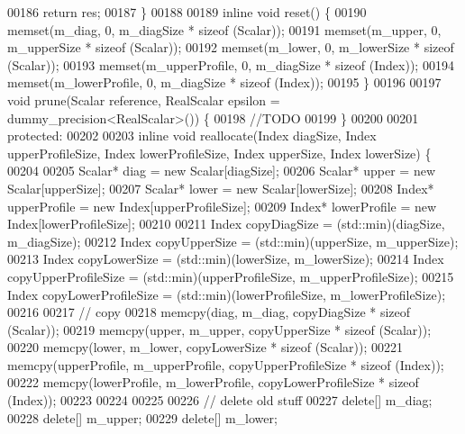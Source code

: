 \begin{DoxyCode}
00186         \textcolor{keywordflow}{return} res;
00187     \}
00188 
00189     \textcolor{keyword}{inline} \textcolor{keywordtype}{void} reset() \{
00190         memset(m\_diag, 0, m\_diagSize * \textcolor{keyword}{sizeof} (Scalar));
00191         memset(m\_upper, 0, m\_upperSize * \textcolor{keyword}{sizeof} (Scalar));
00192         memset(m\_lower, 0, m\_lowerSize * \textcolor{keyword}{sizeof} (Scalar));
00193         memset(m\_upperProfile, 0, m\_diagSize * \textcolor{keyword}{sizeof} (Index));
00194         memset(m\_lowerProfile, 0, m\_diagSize * \textcolor{keyword}{sizeof} (Index));
00195     \}
00196 
00197     \textcolor{keywordtype}{void} prune(Scalar reference, RealScalar epsilon = dummy\_precision<RealScalar>()) \{
00198         \textcolor{comment}{//TODO}
00199     \}
00200 
00201 \textcolor{keyword}{protected}:
00202 
00203     \textcolor{keyword}{inline} \textcolor{keywordtype}{void} reallocate(Index diagSize, Index upperProfileSize, Index lowerProfileSize, Index upperSize,
       Index lowerSize) \{
00204 
00205         Scalar* diag = \textcolor{keyword}{new} Scalar[diagSize];
00206         Scalar* upper = \textcolor{keyword}{new} Scalar[upperSize];
00207         Scalar* lower = \textcolor{keyword}{new} Scalar[lowerSize];
00208         Index* upperProfile = \textcolor{keyword}{new} Index[upperProfileSize];
00209         Index* lowerProfile = \textcolor{keyword}{new} Index[lowerProfileSize];
00210 
00211         Index copyDiagSize = (std::min)(diagSize, m\_diagSize);
00212         Index copyUpperSize = (std::min)(upperSize, m\_upperSize);
00213         Index copyLowerSize = (std::min)(lowerSize, m\_lowerSize);
00214         Index copyUpperProfileSize = (std::min)(upperProfileSize, m\_upperProfileSize);
00215         Index copyLowerProfileSize = (std::min)(lowerProfileSize, m\_lowerProfileSize);
00216 
00217         \textcolor{comment}{// copy}
00218         memcpy(diag, m\_diag, copyDiagSize * \textcolor{keyword}{sizeof} (Scalar));
00219         memcpy(upper, m\_upper, copyUpperSize * \textcolor{keyword}{sizeof} (Scalar));
00220         memcpy(lower, m\_lower, copyLowerSize * \textcolor{keyword}{sizeof} (Scalar));
00221         memcpy(upperProfile, m\_upperProfile, copyUpperProfileSize * \textcolor{keyword}{sizeof} (Index));
00222         memcpy(lowerProfile, m\_lowerProfile, copyLowerProfileSize * \textcolor{keyword}{sizeof} (Index));
00223 
00224 
00225 
00226         \textcolor{comment}{// delete old stuff}
00227         \textcolor{keyword}{delete}[] m\_diag;
00228         \textcolor{keyword}{delete}[] m\_upper;
00229         \textcolor{keyword}{delete}[] m\_lower;

\end{DoxyCode}
